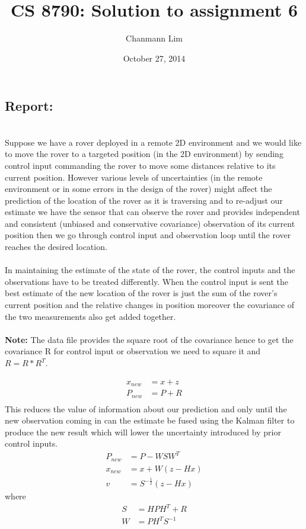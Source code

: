 \documentclass[a4paper]{article}
\begin{document}
\title{CS 8790: Solution to assignment 6}
\author{Chanmann Lim}
\date{October 27, 2014}
\maketitle

\subsection*{Report:} ~\\
\indent Suppose we have a rover deployed in a remote 2D environment and we would like to move the rover to a targeted position (in the 2D environment) by sending control input commanding the rover to move some distances relative to its current position. However various levels of uncertainties (in the remote environment or in some errors in the design of the rover) might affect the prediction of the location of the rover as it is traversing and to re-adjust our estimate we have the sensor that can observe the rover and provides independent and consistent (unbiased and conservative covariance) observation of its current position then we go through control input and observation loop until the rover reaches the desired location. \\
\\
\indent In maintaining the estimate of the state of the rover, the control inputs and the observations have to be treated differently. When the control input is sent the best estimate of the new location of the rover is just the sum of the rover's current position and the relative changes in position moreover the covariance of the two measurements also get added together. \\
\\
\textbf{Note: } The data file provides the square root of the covariance hence to get the covariance R for control input or observation we need to square it and $R = R * R^{T}$.

\begin{align*}
x_{new} &= x + z \\
P_{new} &= P + R \\
\end{align*}
This reduces the value of information about our prediction and only until the new observation coming in can the estimate be fused using the Kalman filter to produce the new result which will lower the uncertainty introduced by prior control inputs. \\
\begin{align*}
P_{new} &= P - WSW^{T}\\
x_{new} &= x + W(z - Hx)\\
v &= S^{-\frac{1}{2}}(z-Hx)
\end{align*}
where
\begin{align*}
S &= HPH^{T} + R\\
W &= PH^{T}S^{-1}
\end{align*}
\end{document}
